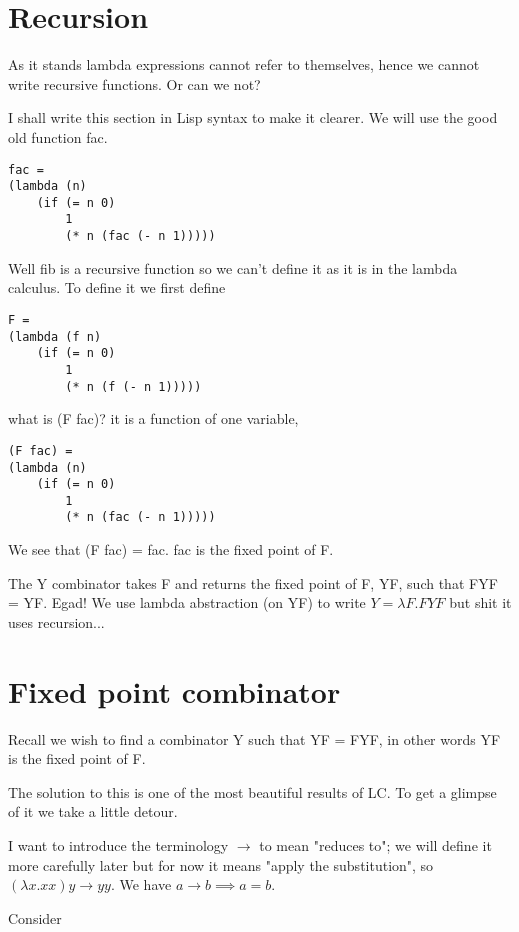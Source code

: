 \documentclass{article}
\begin{document}
\section{Recursion}

As it stands lambda expressions cannot refer to themselves, hence we cannot write recursive functions. Or can we not?

I shall write this section in Lisp syntax to make it clearer. We will use the good old function fac.

\begin{verbatim}
fac = 
(lambda (n)
    (if (= n 0)
        1
        (* n (fac (- n 1)))))
\end{verbatim}

Well fib is a recursive function so we can't define it as it is in the lambda calculus. To define it we first define 

\begin{verbatim}
F = 
(lambda (f n)
    (if (= n 0)
        1
        (* n (f (- n 1)))))
\end{verbatim}

what is (F fac)? it is a function of one variable,

\begin{verbatim}
(F fac) = 
(lambda (n)
    (if (= n 0)
        1
        (* n (fac (- n 1)))))
\end{verbatim}

We see that (F fac) = fac. fac is the fixed point of F.

The Y combinator takes F and returns the fixed point of F, YF, such that FYF = YF. Egad! We use lambda abstraction (on YF) to write $Y = \lambda F. FYF$ but shit it uses recursion...

\section{Fixed point combinator}

Recall we wish to find a combinator Y such that YF = FYF, in other words YF is the fixed point of F.

The solution to this is one of the most beautiful results of LC. To get a glimpse of it we take a little detour.

I want to introduce the terminology $\rightarrow$ to mean "reduces to"; we will define it more carefully later but for now it means "apply the substitution", so $(\lambda x. xx) y \rightarrow yy$. We have $a \rightarrow b \implies a = b$.

Consider
\end{document}
